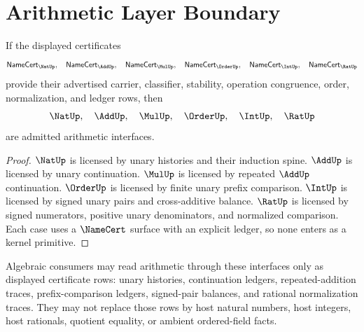 \section{Arithmetic Layer Boundary}
\label{sec:arithmetic-spine-boundary}

\begin{theorem}
\label{thm:arithmetic-spine-admission}
If the displayed certificates
$$
\mathsf{NameCert}_{\NatUp},\quad
\mathsf{NameCert}_{\AddUp},\quad
\mathsf{NameCert}_{\MulUp},\quad
\mathsf{NameCert}_{\OrderUp},\quad
\mathsf{NameCert}_{\IntUp},\quad
\mathsf{NameCert}_{\RatUp}
$$
provide their advertised carrier, classifier, stability, operation
congruence, order, normalization, and ledger rows, then
$$
\NatUp,\quad \AddUp,\quad \MulUp,\quad \OrderUp,\quad \IntUp,\quad \RatUp
$$
are admitted arithmetic interfaces.
\end{theorem}

\begin{proof}
$\NatUp$ is licensed by unary histories and their induction spine.
$\AddUp$ is licensed by unary continuation.  $\MulUp$ is licensed by
repeated $\AddUp$ continuation.  $\OrderUp$ is licensed by finite unary
prefix comparison.  $\IntUp$ is licensed by signed unary pairs and
cross-additive balance.  $\RatUp$ is licensed by signed numerators, positive
unary denominators, and normalized comparison.  Each case uses a
$\NameCert$ surface with an explicit ledger, so none enters as a kernel
primitive.
\end{proof}

\begin{principle}
\label{prin:arithmetic-spine-algebra-boundary}
Algebraic consumers may read arithmetic through these interfaces only as
displayed certificate rows: unary histories, continuation ledgers,
repeated-addition traces, prefix-comparison ledgers, signed-pair balances,
and rational normalization traces.  They may not replace those rows by host
natural numbers, host integers, host rationals, quotient equality, or
ambient ordered-field facts.
\end{principle}

